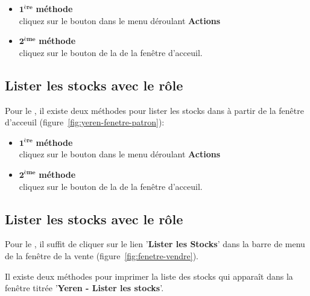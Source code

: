 \begin{itemize}[]
	\item \textcolor{purplish}{$\mathbf{1^{\text{\`ere}}}$ \textbf{m\'ethode}}\\
		cliquez sur le bouton  dans le menu
		d\'eroulant \textbf{Actions}\\

	\item \textcolor{purplish}{$\mathbf{2^{\text{\`eme}}}$ \textbf{m\'ethode}}\\
		cliquez sur le bouton  de la de la fen\^etre d'acceuil.
\end{itemize}

\subsection{Lister les stocks avec le r\^ole \manager}
Pour le \role \manager, il existe deux m\'ethodes pour
lister les stocks dans \yeren \`a partir de la fen\^etre
d'acceuil (figure~\ref{fig:yeren-fenetre-patron}): 

\begin{itemize}[]
	\item \textcolor{purplish}{$\mathbf{1^{\text{\`ere}}}$ \textbf{m\'ethode}}\\
		cliquez sur le bouton  dans le menu
		d\'eroulant \textbf{Actions}\\

	\item \textcolor{purplish}{$\mathbf{2^{\text{\`eme}}}$ \textbf{m\'ethode}}\\
		cliquez sur le bouton  de la de la fen\^etre d'acceuil.
\end{itemize}

\subsection{Lister les stocks avec le r\^ole \caissier}
Pour le \role \caissier, il suffit de cliquer sur le lien
'\textbf{Lister les Stocks}' dans la barre de menu
de la fen\^etre de la vente (figure~\ref{fig:fenetre-vendre}).

\newpage
{}\label{sec:imprimer-liste-stocks}

Il existe deux m\'ethodes pour imprimer la liste des
stocks qui appara\^it dans la fen\^etre titr\'ee
'\textbf{Yeren - Lister les stocks}'.

